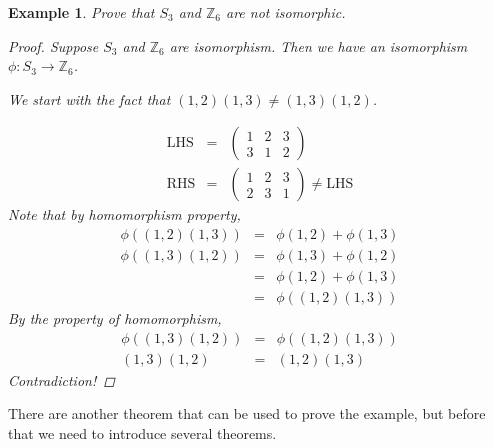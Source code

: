 \documentclass{article}
\theoremstyle{MyNonumberplain}
\theoremstyle{break}
\newtheorem*{proof}{Proof. }
\newcommand{\p}{\phi}
\newcommand{\tmop}{\text}
\theoremstyle{break}
\newtheorem{example}{Example}[section]
\theoremstyle{break}
\theoremstyle{definition}
\theoremstyle{break}
\begin{document}
\begin{expbox}
    \begin{example}
        Prove that $S_3$ and $\mathbb{Z}_6$ are not isomorphic.
        \begin{prfbox}
            \begin{proof}
                Suppose $S_3$ and $\mathbb{Z}_6$ are isomorphism. Then we have an isomorphism
                $\p : S_3 \rightarrow \mathbb{Z}_6$.\bigskip

                We start with the fact that $(1, 2) (1, 3) \neq (1, 3) (1, 2)$.\bigskip

                \begin{eqnarray*}
                \tmop{LHS} & = & \left(\begin{array}{ccc}
                    1 & 2 & 3\\
                    3 & 1 & 2
                \end{array}\right)\\
                \tmop{RHS} & = & \left(\begin{array}{ccc}
                    1 & 2 & 3\\
                    2 & 3 & 1
                \end{array}\right) \neq \tmop{LHS}
                \end{eqnarray*}
                Note that by homomorphism property,
                \begin{eqnarray*}
                \p ((1, 2) (1, 3)) & = & \p (1, 2) + \p (1, 3)\\
                \p ((1, 3) (1, 2)) & = & \p (1, 3) + \p (1, 2)\\
                & = & \p (1, 2) + \p (1, 3)\\
                & = & \p ((1, 2) (1, 3))
                \end{eqnarray*}
                By the property of homomorphism,
                \begin{eqnarray*}
                \p ((1, 3) (1, 2)) & = & \p ((1, 2) (1, 3))\\
                (1, 3) (1, 2) & = & (1, 2) (1, 3)
                \end{eqnarray*}
                Contradiction!
            \end{proof}
        \end{prfbox}
    \end{example}
\end{expbox}

There are another theorem that can be used to prove the example, but before that we need to introduce several theorems. 
\end{document}
